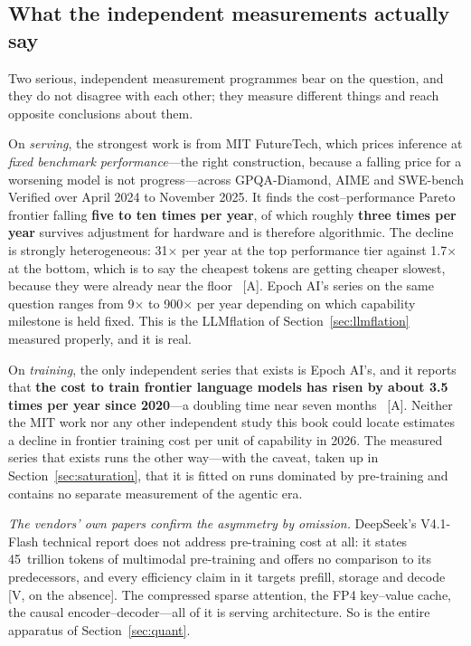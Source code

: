 \subsection{What the independent measurements actually say}

Two serious, independent measurement programmes bear on the question, and they do not disagree with each other; they measure different things and reach opposite conclusions about them.

On \emph{serving}, the strongest work is from MIT FutureTech, which prices inference at \emph{fixed benchmark performance}---the right construction, because a falling price for a worsening model is not progress---across GPQA-Diamond, AIME and SWE-bench Verified over April 2024 to November 2025. It finds the cost--performance Pareto frontier falling \textbf{five to ten times per year}, of which roughly \textbf{three times per year} survives adjustment for hardware and is therefore algorithmic. The decline is strongly heterogeneous: 31$\times$ per year at the top performance tier against 1.7$\times$ at the bottom, which is to say the cheapest tokens are getting cheaper slowest, because they were already near the floor~\cite{futuretech-inference} [A]. Epoch AI's series on the same question ranges from 9$\times$ to 900$\times$ per year depending on which capability milestone is held fixed. This is the LLMflation of Section~\ref{sec:llmflation} measured properly, and it is real.

On \emph{training}, the only independent series that exists is Epoch AI's, and it reports that \textbf{the cost to train frontier language models has risen by about 3.5 times per year since 2020}---a doubling time near seven months~\cite{epoch-training-cost} [A]. Neither the MIT work nor any other independent study this book could locate estimates a decline in frontier training cost per unit of capability in 2026. The measured series that exists runs the other way---with the caveat, taken up in Section~\ref{sec:saturation}, that it is fitted on runs dominated by pre-training and contains no separate measurement of the agentic era.

\emph{The vendors' own papers confirm the asymmetry by omission.} DeepSeek's V4.1-Flash technical report does not address pre-training cost at all: it states 45~trillion tokens of multimodal pre-training and offers no comparison to its predecessors, and every efficiency claim in it targets prefill, storage and decode~\cite{v41flash-nopretrain} [V, on the absence]. The compressed sparse attention, the FP4 key--value cache, the causal encoder--decoder---all of it is serving architecture. So is the entire apparatus of Section~\ref{sec:quant}.

